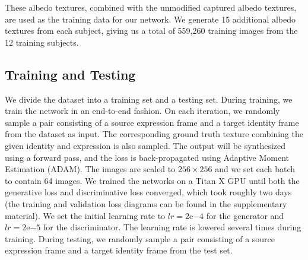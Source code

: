 These albedo textures, combined with the unmodified captured albedo textures, are used as the training data for our network. We generate 15 additional albedo textures from each subject, giving us a total of 559,260 training images from the 12 training subjects.

\subsection{Training and Testing}

We divide the dataset into a training set and a testing set. During training, we train the network in an end-to-end fashion. On each iteration, we randomly sample a pair consisting of a source expression frame and a target identity frame from the dataset as input. The corresponding ground truth texture combining the given identity and expression is also sampled. The output will be synthesized using a forward pass, and the loss is back-propagated using Adaptive Moment Estimation (ADAM). The images are scaled to $256 \times 256$ and we set each batch to contain 64 images. We trained the networks on a Titan X GPU until both the generative loss and discriminative loss converged, which took roughly two days (the training and validation loss diagrams can be found in the supplementary material). We set the initial learning rate to $lr=2\mathrm{e}{-4}$ for the generator and $lr=2\mathrm{e}{-5}$ for the discriminator. The learning rate is lowered several times during training. During testing, we randomly sample a pair consisting of a source expression frame and a target identity frame from the test set.
